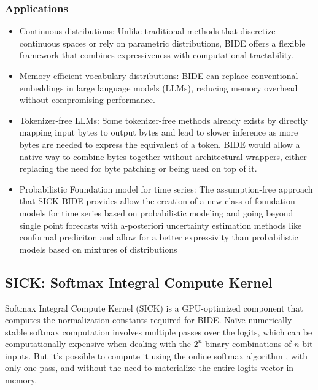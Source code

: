 \documentclass{article}
\begin{document}
\subsubsection{Applications}
\begin{itemize} 
\item Continuous distributions: Unlike traditional methods that discretize continuous spaces or rely on parametric distributions, BIDE offers a flexible framework that combines expressiveness with computational tractability.
\item Memory-efficient vocabulary distributions: BIDE can replace conventional embeddings in large language models (LLMs), reducing memory overhead without compromising performance.
\item Tokenizer-free LLMs: Some tokenizer-free methods already exists by directly mapping input bytes to output bytes \cite{xue2022byt5}\cite{meta2024bytelatenttransformer} and lead to slower inference as more bytes are needed to express the equivalent of a token. BIDE would allow a native way to combine bytes together without architectural wrappers, either replacing the need for byte patching or being used on top of it.
\item Probabilistic Foundation model for time series: The assumption-free approach that SICK BIDE provides allow the creation of a new class of foundation models for time series based on probabilistic modeling and going beyond single point forecasts \cite{Garza2023timegpt} with a-posteriori uncertainty estimation methods like conformal prediciton \cite{angelopoulos2022gentleintroductionconformalprediction} and allow for a better expressivity than probabilistic models based on mixtures of distributions \cite{woo2024unifiedtraininguniversaltime}
\end{itemize}

\subsection{SICK: Softmax Integral Compute Kernel}
Softmax Integral Compute Kernel (SICK) is a GPU-optimized component that computes the normalization constants required for BIDE. Naïve numerically-stable softmax computation involves multiple passes over the logits, which can be computationally expensive when dealing with the $2^n$ binary combinations of $n$-bit inputs. But it's possible to compute it using the online softmax algorithm \cite{milakov2018onlinesoftmax}, with only one pass, and without the need to materialize the entire logits vector in memory.
\end{document}

